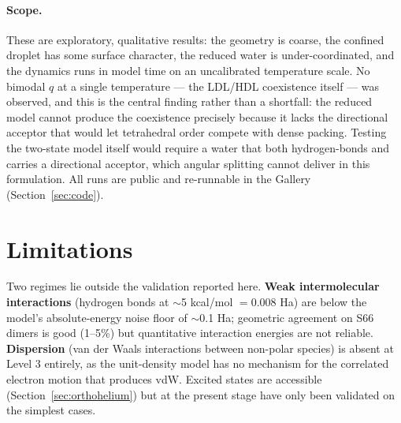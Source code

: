 \documentclass[11pt]{article}
\begin{document}
\paragraph{Scope.} These are exploratory, qualitative results: the geometry is coarse, the confined
droplet has some surface character, the reduced water is under-coordinated, and the dynamics runs in
model time on an uncalibrated temperature scale. No bimodal $q$ at a single temperature --- the
LDL/HDL coexistence itself --- was observed, and this is the central finding rather than a shortfall:
the reduced model cannot produce the coexistence precisely because it lacks the directional acceptor
that would let tetrahedral order compete with dense packing. Testing the two-state model itself would
require a water that both hydrogen-bonds and carries a directional acceptor, which angular splitting
cannot deliver in this formulation. All runs are public and re-runnable in the Gallery
(Section~\ref{sec:code}).

\section{Limitations}\label{sec:limitations}

Two regimes lie outside the validation reported here. \textbf{Weak intermolecular interactions} (hydrogen bonds at $\sim$5 kcal/mol $= 0.008$ Ha) are below the model's absolute-energy noise floor of $\sim$0.1 Ha; geometric agreement on S66 dimers is good (1--5\%) but quantitative interaction energies are not reliable. \textbf{Dispersion} (van der Waals interactions between non-polar species) is absent at Level 3 entirely, as the unit-density model has no mechanism for the correlated electron motion that produces vdW. Excited states are accessible (Section~\ref{sec:orthohelium}) but at the present stage have only been validated on the simplest cases.
\end{document}
